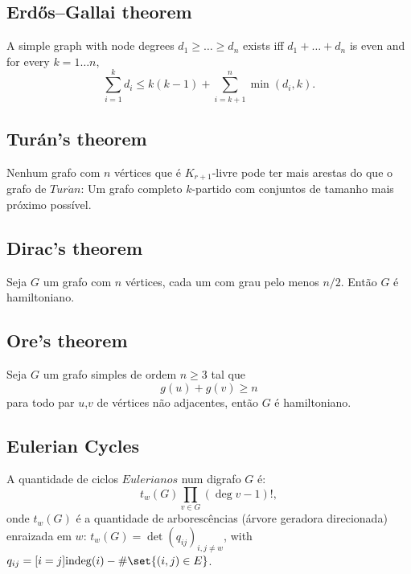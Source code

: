 \subsection{Erdős–Gallai theorem}
		A simple graph with node degrees $d_1 \ge \dots \ge d_n$ exists iff $d_1 + \dots + d_n$ is even and for every $k = 1\dots n$,
		\[ \sum _{i=1}^{k}d_{i}\leq k(k-1)+\sum _{i=k+1}^{n}\min(d_{i},k). \]

\iffalse
\subsection{Synchronizing word problem}
A DFA has a synchronizing word (an input sequence that moves all states
to the same state) iff.\ each pair of states has a synchronizing word.
That can be checked using reverse DFS over pairs of states. Finding the
shortest synchronizing word is NP-complete.
\fi

\subsection{Turán's theorem} 
Nenhum grafo com $n$ vértices que é $K_{r+1}$-livre pode ter mais arestas do que o grafo de $Tur\acute{a}n$: Um grafo completo $k$-partido com conjuntos de tamanho mais próximo possível.


\subsection{Dirac's theorem} Seja $G$ um grafo com $n$ vértices, cada um com grau pelo menos $n/2$. Então $G$ é hamiltoniano.

\subsection{Ore's theorem} Seja $G$ um grafo simples de ordem $n \geq 3$ tal que 
\[g(u) + g(v) \geq n \] para todo par $u$,$v$ de vértices não adjacentes, então $G$ é hamiltoniano.

\subsection{Eulerian Cycles}
A quantidade de ciclos $Eulerianos$ num digrafo $G$ é:\newline
		\begin{equation*}
			t_w(G) \prod_{v \in G} (\deg v - 1)!,
		\end{equation*}\newline
		onde $t_w(G)$ é a quantidade de arborescências (árvore geradora direcionada) enraizada em $w$: $t_w(G) = \det\left( q_{ij} \right)_{i,j \neq w}$, with $q_{ij} = [i=j] \mathrm{indeg}(i) - \# \set{(i,j) \in E}$.

